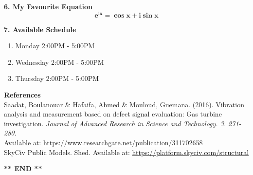 \documentclass[12pt,a4paper]{article}
\begin{document}
\textbf{6. My Favourite Equation}
\begin{equation}
  \mathbf{e}^\mathbf{ix} = \mathbf{\cos{x}} + \mathbf{i \sin{x}}
\end{equation}
\bigskip

\newpage

\textbf{7. Available Schedule}
\begin{enumerate}
  \item Monday 2:00PM - 5:00PM
  \item Wednesday 2:00PM - 5:00PM
  \item Thursday 2:00PM - 5:00PM
\end{enumerate}
\bigskip

\noindent \textbf{References}\\

\noindent [\ref{image}] Saadat, Boulanouar \& Hafaifa, Ahmed \& Mouloud, Guemana. (2016).
Vibration analysis and measurement based on defect signal evaluation: Gas turbine investigation.
\textit{Journal of Advanced Research in Science and Technology. 3. 271-280.}\\
Available at: \href{https://www.researchgate.net/publication/311702658_Vibration_analysis_and_measurement_based_on_defect_signal_evaluation_Gas_turbine_investigation}{https://www.researchgate.net/publication/311702658}\\

\noindent [\ref{demoanimation}] SkyCiv Public Models. Shed. Available at: \href{https://platform.skyciv.com/structural-viewer?project_id=XHF6tNMFn1f4DygFrx0ulDonP6gm68EuylJb2mJufZjmZxt8wxq45aVxstavH77u}{https://platform.skyciv.com/structural}

\bigskip
\bigskip
\bigskip

\begin{center}
  \textbf{** END **}
\end{center}
\end{document}
